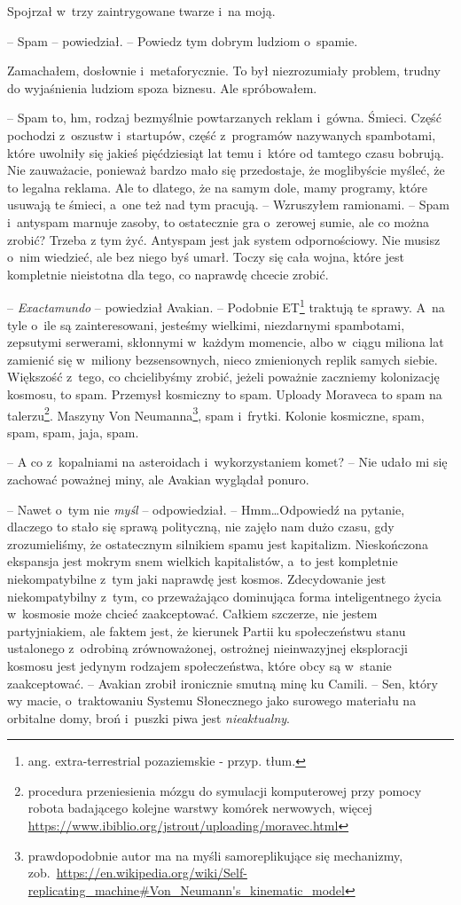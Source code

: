 \documentclass[oneside,polish,12pt,sfheadings]{mwbk}
\begin{document}
Spojrzał w~trzy zaintrygowane twarze i~na moją.

-- Spam -- powiedział. -- Powiedz tym dobrym ludziom o~spamie.

Zamachałem, dosłownie i~metaforycznie. To był niezrozumiały problem,
trudny do wyjaśnienia ludziom spoza biznesu. Ale spróbowałem.

-- Spam to, hm, rodzaj bezmyślnie powtarzanych reklam i~gówna. Śmieci.
Część pochodzi z~oszustw i~startupów, część z~programów nazywanych
spambotami, które uwolniły się jakieś pięćdziesiąt lat temu i~które od
tamtego czasu bobrują. Nie zauważacie, ponieważ bardzo mało się
przedostaje, że moglibyście myśleć, że to legalna reklama. Ale to
dlatego, że na samym dole, mamy programy, które usuwają te śmieci, a~one
też nad tym pracują. -- Wzruszyłem ramionami. -- Spam i~antyspam marnuje
zasoby, to ostatecznie gra o~zerowej sumie, ale co można zrobić? Trzeba
z tym żyć. Antyspam jest jak system odpornościowy. Nie musisz o~nim
wiedzieć, ale bez niego byś umarł. Toczy się cała wojna, które jest
kompletnie nieistotna dla tego, co naprawdę chcecie zrobić.

-- \emph{Exactamundo } -- powiedział Avakian. -- Podobnie
ET\footnote{ang. extra-terrestrial pozaziemskie - przyp.
tłum.} traktują te sprawy. A~na tyle o~ile są zainteresowani, jesteśmy
wielkimi, niezdarnymi spambotami, zepsutymi serwerami, skłonnymi w~każdym momencie, albo w~ciągu miliona lat zamienić się w~miliony
bezsensownych, nieco zmienionych replik samych siebie. Większość z~tego,
co chcielibyśmy zrobić, jeżeli poważnie zaczniemy kolonizację kosmosu,
to spam. Przemysł kosmiczny to spam. Uploady Moraveca to spam na
talerzu\footnote{procedura przeniesienia mózgu do
symulacji komputerowej przy pomocy robota badającego kolejne warstwy
komórek nerwowych, więcej
\url{https://www.ibiblio.org/jstrout/uploading/moravec.html}}. Maszyny Von
Neumanna\footnote{prawdopodobnie autor ma na myśli
samoreplikujące się mechanizmy, zob.~\url{https://en.wikipedia.org/wiki/Self-replicating\_machine\#Von\_Neumann's\_kinematic\_model}},
spam i~frytki. Kolonie kosmiczne, spam, spam, spam, jaja, spam.

-- A co z~kopalniami na asteroidach i~wykorzystaniem komet? -- Nie udało mi
się zachować poważnej miny, ale Avakian wyglądał ponuro.

-- Nawet o~tym nie \emph{myśl} -- odpowiedział. -- Hmm\ldots Odpowiedź na
pytanie, dlaczego to stało się sprawą polityczną, nie zajęło nam dużo
czasu, gdy zrozumieliśmy, że ostatecznym silnikiem spamu jest
kapitalizm. Nieskończona ekspansja jest mokrym snem wielkich
kapitalistów, a~to jest kompletnie niekompatybilne z~tym jaki naprawdę
jest kosmos. Zdecydowanie jest niekompatybilny z~tym, co przeważająco
dominująca forma inteligentnego życia w~kosmosie może chcieć
zaakceptować. Całkiem szczerze, nie jestem partyjniakiem, ale faktem
jest, że kierunek Partii ku społeczeństwu stanu ustalonego z~odrobiną
zrównoważonej, ostrożnej nieinwazyjnej eksploracji kosmosu jest jedynym
rodzajem społeczeństwa, które obcy są w~stanie zaakceptować. -- Avakian
zrobił ironicznie smutną minę ku Camili. -- Sen, który wy macie, o~traktowaniu Systemu Słonecznego jako surowego materiału na orbitalne
domy, broń i~puszki piwa jest \emph{nieaktualny}.
\end{document}
